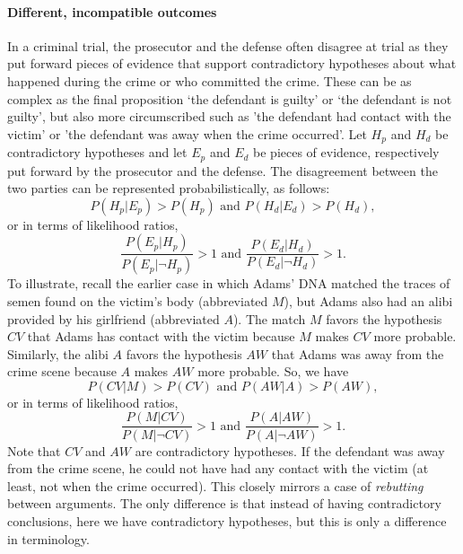 \documentclass[10pt]{article}
\begin{document}
%
%
%

\paragraph{Different, incompatible outcomes}

In a criminal trial, the prosecutor and the defense often disagree at trial as they put forward pieces 
of evidence that support contradictory hypotheses about what happened 
during the crime or who committed the crime. These can be as complex as the final proposition `the defendant is guilty' or `the defendant is not guilty', but also more circumscribed such as 'the defendant had contact with the victim' or 'the defendant was away when the crime occurred'. Let $H_p$ and $H_d$ be contradictory hypotheses 
and let $E_p$ and $E_d$ be pieces of evidence, respectively put forward by the prosecutor and the defense. 
The disagreement between the two parties can be represented probabilistically, as follows:
%
\[P(H_p| E_p)>P(H_p) \text{ and } P(H_d|E_d)>P(H_d),\]
%
or in terms of likelihood ratios, 
%
\[\frac{P(E_p| H_p)}{P(E_p|\neg H_p)}>1 \text{ and } \frac{P(E_d|H_d)}{P(E_d|\neg H_d)}>1.\] 
%
%
To illustrate, recall the earlier case in which Adams' DNA matched the traces of semen found on the victim's body (abbreviated $M$),
but Adams also had an alibi provided by his girlfriend (abbreviated $A$). The match $M$ favors the hypothesis $CV$ that Adams has contact with the victim 
because $M$ makes $CV$ more probable. Similarly, the alibi $A$ favors the hypothesis $AW$ that Adams was away 
from the crime scene because $A$ makes $AW$ more probable. So, we have
%
\[P(CV| M)>P(CV) \text{ and } P(AW|A)>P(AW),\]
%
or in terms of likelihood ratios, 
%
\[\frac{P(M| CV)}{P(M|\neg CV)}>1 \text{ and } \frac{P(A|AW)}{P(A|\neg AW)}>1.\] 
%
Note that $CV$ and $AW$ are contradictory hypotheses. If the defendant was away from the crime scene, 
he could not have had any contact with the victim (at least, not when the crime occurred). 
This closely mirrors a case of \textit{rebutting} between arguments. The only difference is that instead of having contradictory conclusions, 
here we have contradictory hypotheses, but this is only a difference in terminology.
\end{document}
